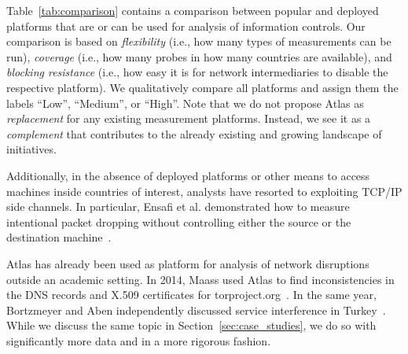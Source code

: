 Table~\ref{tab:comparison} contains a comparison between popular and deployed
platforms that are or can be used for analysis of information controls.  Our comparison is
based on \emph{flexibility} (i.e., how many types of measurements can be run),
\emph{coverage} (i.e., how many probes in how many countries are available),
and \emph{blocking resistance} (i.e., how easy it is for network intermediaries to disable the
respective platform).  We qualitatively compare all platforms and assign them
the labels ``Low'', ``Medium'', or ``High''.  Note that we do not propose
Atlas as \emph{replacement} for any existing measurement platforms.
Instead, we see it as a \emph{complement} that contributes to the already
existing and growing landscape of initiatives.

Additionally, in the absence of deployed platforms or other means to access
machines inside countries of interest, analysts have resorted to
exploiting TCP/IP side channels.  In particular, Ensafi et al. demonstrated
how to measure intentional packet dropping without controlling
either the source or the destination machine~\cite{Ensafi2014}.

Atlas has already been used as platform for analysis of network
disruptions outside an academic setting.  In 2014, Maass used Atlas to
find inconsistencies in the DNS records and X.509 certificates for
torproject.org~\cite{Maass2014}.  In the same year, Bortzmeyer and Aben
independently discussed service interference in
Turkey~\cite{Bortzmeyer14,Aben14}.  While we discuss the same topic in
Section~\ref{sec:case_studies}, we do so with significantly more data
and in a more rigorous fashion.
